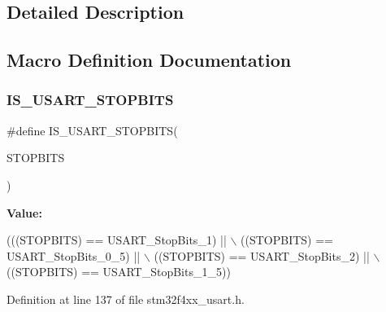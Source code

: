 \subsection{Detailed Description}


\subsection{Macro Definition Documentation}
\mbox{\label{group___u_s_a_r_t___stop___bits_ga6f9153c1fbee1058ba26ec88f0f20828}} 
\subsubsection{\texorpdfstring{I\+S\+\_\+\+U\+S\+A\+R\+T\+\_\+\+S\+T\+O\+P\+B\+I\+TS}{IS\_USART\_STOPBITS}}
{\footnotesize\ttfamily \#define I\+S\+\_\+\+U\+S\+A\+R\+T\+\_\+\+S\+T\+O\+P\+B\+I\+TS(\begin{DoxyParamCaption}\item[{}]{S\+T\+O\+P\+B\+I\+TS }\end{DoxyParamCaption})}

{\bfseries Value\+:}
\begin{DoxyCode}
(((STOPBITS) == USART\_StopBits\_1) || \(\backslash\)
                                     ((STOPBITS) == USART\_StopBits\_0\_5) || \(\backslash\)
                                     ((STOPBITS) == USART\_StopBits\_2) || \(\backslash\)
                                     ((STOPBITS) == USART\_StopBits\_1\_5))
\end{DoxyCode}


Definition at line 137 of file stm32f4xx\+\_\+usart.\+h.

